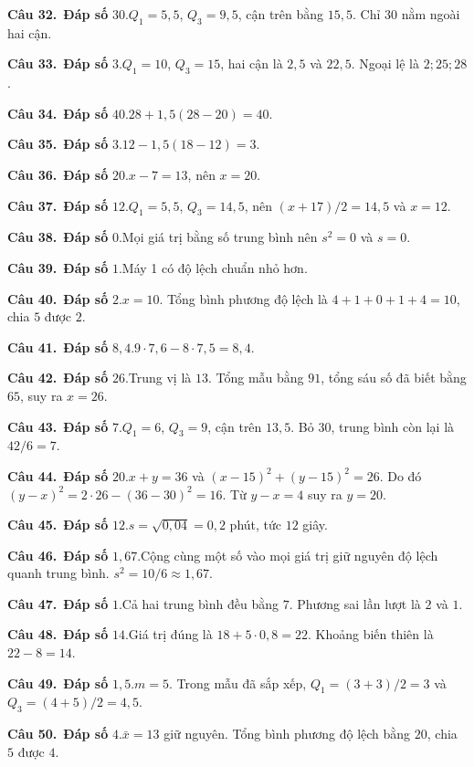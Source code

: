 \documentclass[12pt,a4paper]{article}
\newcommand{\banner}[1]{\par\medskip{\large\bfseries\color{ink}#1}\par\smallskip}
\newcommand{\solution}[3]{%
  \begin{minipage}{\linewidth}
    \textbf{Câu #1.}\ \textbf{Đáp số} \(\boxed{#2}\).\quad #3
  \end{minipage}\par\medskip}
\begin{document}
\solution{32}{30}{$Q_1=5{,}5$, $Q_3=9{,}5$, cận trên bằng $15{,}5$. Chỉ $30$ nằm ngoài hai cận.}
\solution{33}{3}{$Q_1=10$, $Q_3=15$, hai cận là $2{,}5$ và $22{,}5$. Ngoại lệ là $2;25;28$.}
\solution{34}{40}{$28+1{,}5(28-20)=40$.}
\solution{35}{3}{$12-1{,}5(18-12)=3$.}
\solution{36}{20}{$x-7=13$, nên $x=20$.}
\solution{37}{12}{$Q_1=5{,}5$, $Q_3=14{,}5$, nên $(x+17)/2=14{,}5$ và $x=12$.}
\solution{38}{0}{Mọi giá trị bằng số trung bình nên $s^2=0$ và $s=0$.}
\solution{39}{1}{Máy 1 có độ lệch chuẩn nhỏ hơn.}
\solution{40}{2}{$x=10$. Tổng bình phương độ lệch là $4+1+0+1+4=10$, chia $5$ được $2$.}
\banner{Bài tập tổng hợp Chương V}
\solution{41}{8{,}4}{$9\cdot7{,}6-8\cdot7{,}5=8{,}4$.}
\solution{42}{26}{Trung vị là $13$. Tổng mẫu bằng $91$, tổng sáu số đã biết bằng $65$, suy ra $x=26$.}
\solution{43}{7}{$Q_1=6$, $Q_3=9$, cận trên $13{,}5$. Bỏ $30$, trung bình còn lại là $42/6=7$.}
\solution{44}{20}{$x+y=36$ và $(x-15)^2+(y-15)^2=26$. Do đó $(y-x)^2=2\cdot26-(36-30)^2=16$. Từ $y-x=4$ suy ra $y=20$.}
\solution{45}{12}{$s=\sqrt{0{,}04}=0{,}2$ phút, tức $12$ giây.}
\solution{46}{1{,}67}{Cộng cùng một số vào mọi giá trị giữ nguyên độ lệch quanh trung bình. $s^2=10/6\approx1{,}67$.}
\solution{47}{1}{Cả hai trung bình đều bằng $7$. Phương sai lần lượt là $2$ và $1$.}
\solution{48}{14}{Giá trị đúng là $18+5\cdot0{,}8=22$. Khoảng biến thiên là $22-8=14$.}
\solution{49}{1{,}5}{$m=5$. Trong mẫu đã sắp xếp, $Q_1=(3+3)/2=3$ và $Q_3=(4+5)/2=4{,}5$.}
\solution{50}{4}{$\bar x=13$ giữ nguyên. Tổng bình phương độ lệch bằng $20$, chia $5$ được $4$.}
\end{document}
